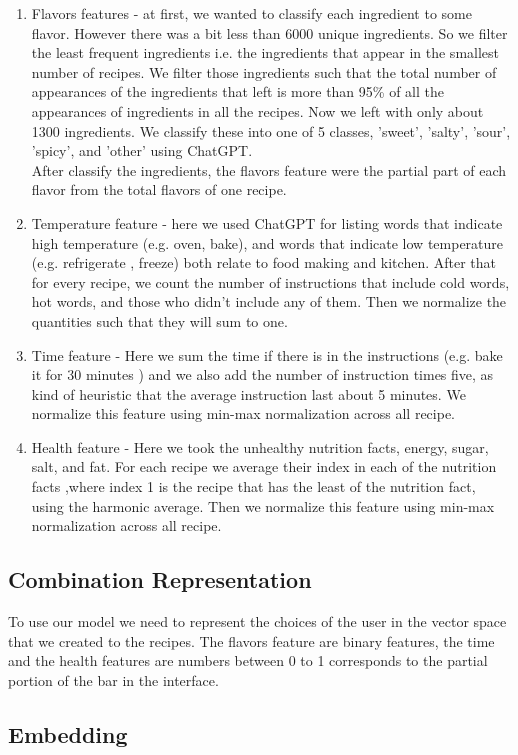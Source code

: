 \documentclass[]{article}
\begin{document}
\begin{enumerate}
	\item Flavors features - at first, we wanted to classify each ingredient to some flavor. However there was a bit less than 6000 unique ingredients. So we filter the least frequent ingredients i.e. the ingredients that appear in the smallest number of recipes. We filter those ingredients such that the total number of appearances of the ingredients that left is more than 95\% of all the appearances of ingredients in all the recipes. Now we left with only about 1300 ingredients. We classify these into one of 5 classes, 'sweet', 'salty', 'sour', 'spicy', and 'other' using ChatGPT.\\
	After classify the ingredients, the flavors feature were the partial part of each flavor from the total flavors of one recipe.
	\item Temperature feature - here we used ChatGPT for listing words that indicate high temperature (e.g. oven, bake), and words that indicate low temperature (e.g. refrigerate , freeze) both relate to food making and kitchen. After that for every recipe, we count the number of instructions that include cold words, hot words, and those who didn't include any of them. Then we normalize the quantities such that they will sum to one.
	\item Time feature - Here we sum the time if there is in the instructions (e.g. bake it for 30 minutes ) and we also add the number of instruction times five, as kind of heuristic that the average instruction last about 5 minutes. We normalize this feature using min-max normalization across all recipe. 
	\item Health feature - Here we took the unhealthy nutrition facts, energy, sugar, salt, and fat. For each recipe we average their index in each of the nutrition facts ,where index 1 is the recipe that has the least of the nutrition fact, using the harmonic average. Then we normalize this feature using min-max normalization across all recipe. 
\end{enumerate}
\subsection{Combination Representation}
To use our model we need to represent the choices of the user in the vector space that we created to the recipes. The flavors feature are binary features, the time and the health features are numbers between 0 to 1 corresponds to the partial portion of the bar in the interface. 
\subsection{Embedding}
\end{document}

